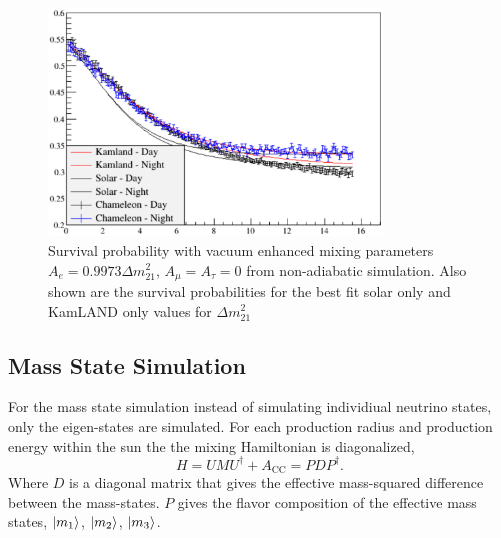 \begin{figure}[htbp]
    \centering
    \includegraphics[width=0.79\textwidth]{non_adiabatic_example}
    \caption[Example Non-adiabatic Vacuum Enhance Neutrino Survival Probability]{
        Survival probability with vacuum enhanced mixing parameters
        $A_{e}=0.9973\Delta m^{2}_{21}$, $A_{\mu}=A_{\tau}=0$
    from non-adiabatic simulation. Also shown are the survival probabilities
    for the best fit solar only and KamLAND only values for $\Delta m^{2}_{21}$}
    \label{fig:nonadiabatic_example}
\end{figure}

\subsection{Mass State Simulation} %
For the mass state simulation instead of simulating individiual neutrino
states, only the eigen-states are simulated.
For each production radius and production energy within the sun the
the mixing Hamiltonian is diagonalized,
\begin{equation}
    H = U M U^{\dagger} + A_{\mathrm{CC}} = P D P^{\dagger}\text{.}
\end{equation}
Where $D$ is a diagonal matrix that gives the effective mass-squared
difference between the mass-states.
$P$ gives the flavor composition of the effective mass states,
$\ket{m_{1}}$, $\ket{m_{2}}$, $\ket{m_{3}}$.

